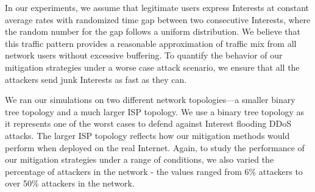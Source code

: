 
In our experiments, we assume that legitimate users express Interests at constant average rates with randomized time gap between two consecutive Interests, where the random number for the gap follows a uniform distribution. We believe that this traffic pattern provides a reasonable approximation of traffic mix from all network users without excessive buffering. To quantify the behavior of our mitigation strategies under a worse case attack scenario, we ensure that all the attackers send junk Interests as fast as they can. 



We ran our simulations on two different network topologies---a smaller binary tree topology and a much larger ISP topology. We use a binary tree topology as it represents one of the worst cases to defend against Interest flooding DDoS attacks. The larger ISP topology reflects how our mitigation methods would perform when deployed on the real Internet.
Again, to study the performance of our mitigation strategies under a range of conditions, we also varied the percentage of attackers in the network - the values ranged from 6\% attackers to over 50\% attackers in the network.

